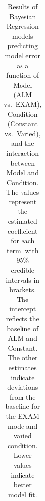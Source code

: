 \documentclass[
  11pt,
  letterpaper,
]{article}
\begin{document}
\newpage{}

\scriptsize

\begingroup
\fontsize{9.0pt}{10.8pt}\selectfont

\begin{longtable}{llrrrr}

\caption{\label{tbl-htw-ee-e23}Results of Bayesian Regression models
predicting model error as a function of Model (ALM vs.~EXAM), Condition
(Constant vs.~Varied), and the interaction between Model and Condition.
The values represent the estimated coefficient for each term, with 95\%
credible intervals in brackets. The intercept reflects the baseline of
ALM and Constant. The other estimates indicate deviations from the
baseline for the EXAM mode and varied condition. Lower values indicate
better model fit.}

\tabularnewline


\end{longtable}
\end{document}
